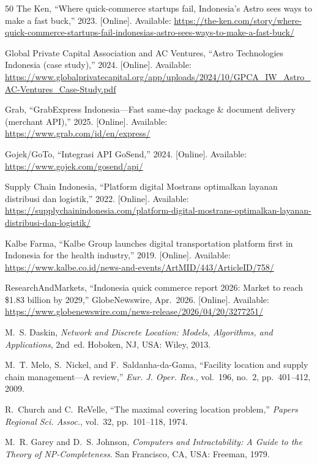 \documentclass[journal]{IEEEtran}
\begin{document}
\begin{thebibliography}{50}
 The Ken, ``Where quick-commerce startups fail, Indonesia's Astro sees ways to make a fast buck,'' 2023. [Online]. Available: \url{https://the-ken.com/story/where-quick-commerce-startups-fail-indonesias-astro-sees-ways-to-make-a-fast-buck/}

 Global Private Capital Association and AC Ventures, ``Astro Technologies Indonesia (case study),'' 2024. [Online]. Available: \url{https://www.globalprivatecapital.org/app/uploads/2024/10/GPCA_IW_Astro_AC-Ventures_Case-Study.pdf}

 Grab, ``GrabExpress Indonesia---Fast same-day package \& document delivery (merchant API),'' 2025. [Online]. Available: \url{https://www.grab.com/id/en/express/}

 Gojek/GoTo, ``Integrasi API GoSend,'' 2024. [Online]. Available: \url{https://www.gojek.com/gosend/api/}

 Supply Chain Indonesia, ``Platform digital Mostrans optimalkan layanan distribusi dan logistik,'' 2022. [Online]. Available: \url{https://supplychainindonesia.com/platform-digital-mostrans-optimalkan-layanan-distribusi-dan-logistik/}

 Kalbe Farma, ``Kalbe Group launches digital transportation platform first in Indonesia for the health industry,'' 2019. [Online]. Available: \url{https://www.kalbe.co.id/news-and-events/ArtMID/443/ArticleID/758/}

 ResearchAndMarkets, ``Indonesia quick commerce report 2026: Market to reach \$1.83 billion by 2029,'' GlobeNewswire, Apr.~2026. [Online]. Available: \url{https://www.globenewswire.com/news-release/2026/04/20/3277251/}

 M.~S. Daskin, \emph{Network and Discrete Location: Models, Algorithms, and Applications}, 2nd~ed. Hoboken, NJ, USA: Wiley, 2013.

 M.~T. Melo, S.~Nickel, and F.~Saldanha-da-Gama, ``Facility location and supply chain management---A review,'' \emph{Eur. J. Oper. Res.}, vol.~196, no.~2, pp.~401--412, 2009.

 R.~Church and C.~ReVelle, ``The maximal covering location problem,'' \emph{Papers Regional Sci. Assoc.}, vol.~32, pp.~101--118, 1974.

 M.~R. Garey and D.~S. Johnson, \emph{Computers and Intractability: A Guide to the Theory of NP-Completeness}. San Francisco, CA, USA: Freeman, 1979.


\end{thebibliography}
\end{document}
